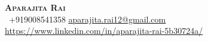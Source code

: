 \begin{center}
    \textbf{\huge \scshape Aparajita Rai} \\ \vspace{-2pt}
     \ \small +919008541358 \quad
    \href{mailto:aparajita.rai12@gmail.com}{ \underline{aparajita.rai12@gmail.com}} \quad
    \href{https://www.linkedin.com/in/aparajita-rai-5b30724a/}{ \underline{https://www.linkedin.com/in/aparajita-rai-5b30724a/}} 
\end{center}